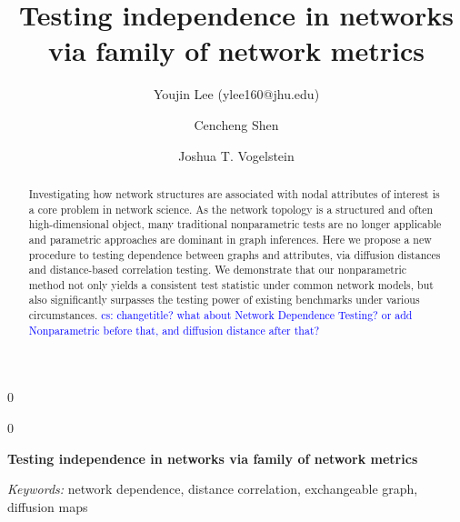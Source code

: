 \documentclass[11pt]{article}
\theoremstyle{definition}
\newcommand{\blind}{0}
\newcommand{\cs}[1]{\textcolor{blue}{cs: #1}}
\begin{document}
\def\spacingset#1{\renewcommand{\baselinestretch}%
{#1}\small\normalsize} \spacingset{1}

\title{\bf Testing independence in networks via family of network metrics}
\blind
{\author[1]{Youjin Lee (ylee160@jhu.edu)} %
	\author[2]{Cencheng Shen} %
	\author[2,3,4]{Joshua T. Vogelstein}
	\maketitle
} \fi

	\blind
	{
		\bigskip
		\bigskip
		\bigskip
		\begin{center}
			{\LARGE\bf Testing independence in networks via family of network metrics}
		\end{center}
		\medskip
	} \fi

\begin{abstract}
Investigating how network structures are associated with nodal attributes of interest is a core problem in network science. As the network topology is a structured and often high-dimensional object, many traditional nonparametric tests are no longer applicable and parametric approaches are dominant in graph inferences. Here we propose a new procedure to testing dependence between graphs and attributes, via diffusion distances and distance-based correlation testing. We demonstrate that our nonparametric method not only yields a consistent test statistic under common network models, but also significantly surpasses the testing power of existing benchmarks under various circumstances.  	\cs{changetitle? what about Network Dependence Testing? or add Nonparametric before that, and diffusion distance after that?}
\end{abstract}

\noindent%
{\it Keywords:} network dependence, distance correlation, exchangeable graph, diffusion maps

\sloppy
\doublespacing
\end{document}

